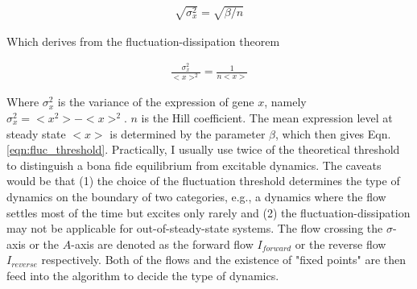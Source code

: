 \begin{align}
    \sqrt{\sigma_x^2} = \sqrt{\beta/n}
    \label{eqn:fluc_threshold}
\end{align}

Which derives from the fluctuation-dissipation theorem\cite{paulsson05a}

\begin{align}
    \frac{\sigma_x^2}{<x>^2} = \frac{1}{n<x>}
\end{align}

Where $\sigma_x^2$ is the variance of the expression of gene $x$, namely
$\sigma_x^2 = <x^2> - <x>^2$. $n$ is the Hill coefficient.
The mean expression level at steady state $<x>$ is determined by the parameter $\beta$,
which then gives Eqn. \ref{eqn:fluc_threshold}.
Practically, I usually use twice of the theoretical threshold to distinguish
a bona fide equilibrium from excitable dynamics.
The caveats would be that (1) the choice of the fluctuation threshold determines
the type of dynamics on the boundary of two categories, e.g., a dynamics where
the flow settles most of the time but excites only rarely
and (2) the fluctuation-dissipation may not be applicable for out-of-steady-state
systems\cite{chabot07}.
The flow crossing the $\sigma$-axis or the $A$-axis are denoted as the forward flow
$I_{forward}$ or the reverse flow $I_{reverse}$ respectively.
Both of the flows and the existence of "fixed points" are then feed into the 
algorithm to decide the type of dynamics.

